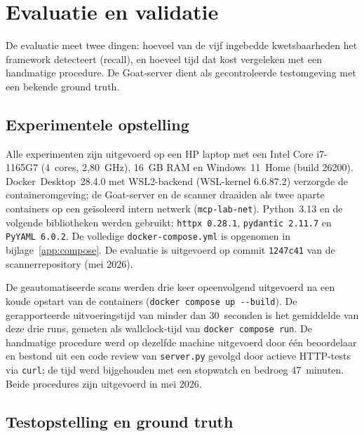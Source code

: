 
\chapter{Evaluatie en validatie}%
\label{ch:validatie}

De evaluatie meet twee dingen: hoeveel van de vijf ingebedde kwetsbaarheden het framework detecteert (recall), en hoeveel tijd dat kost vergeleken met een handmatige procedure. De Goat-server dient als gecontroleerde testomgeving met een bekende ground truth.

\section{Experimentele opstelling}
\label{sec:opstelling}

Alle experimenten zijn uitgevoerd op een HP laptop met een Intel Core i7-1165G7 (4~cores, 2{,}80~GHz), 16~GB RAM en Windows~11~Home (build 26200). Docker~Desktop~28.4.0 met WSL2-backend (WSL-kernel 6.6.87.2) verzorgde de containeromgeving; de Goat-server en de scanner draaiden als twee aparte containers op een geïsoleerd intern netwerk (\texttt{mcp-lab-net}). Python~3.13 en de volgende bibliotheken werden gebruikt: \texttt{httpx~0.28.1}, \texttt{pydantic~2.11.7} en \texttt{PyYAML~6.0.2}. De volledige \texttt{docker-compose.yml} is opgenomen in bijlage~\ref{app:compose}. De evaluatie is uitgevoerd op commit \texttt{1247c41} van de scannerrepository (mei 2026).

De geautomatiseerde scans werden drie keer opeenvolgend uitgevoerd na een koude opstart van de containers (\texttt{docker compose up -{}-build}). De gerapporteerde uitvoeringstijd van minder dan 30~seconden is het gemiddelde van deze drie runs, gemeten als wallclock-tijd van \texttt{docker compose run}. De handmatige procedure werd op dezelfde machine uitgevoerd door één beoordelaar en bestond uit een code review van \texttt{server.py} gevolgd door actieve HTTP-tests via \texttt{curl}; de tijd werd bijgehouden met een stopwatch en bedroeg 47~minuten. Beide procedures zijn uitgevoerd in mei 2026.

\section{Testopstelling en ground truth}

